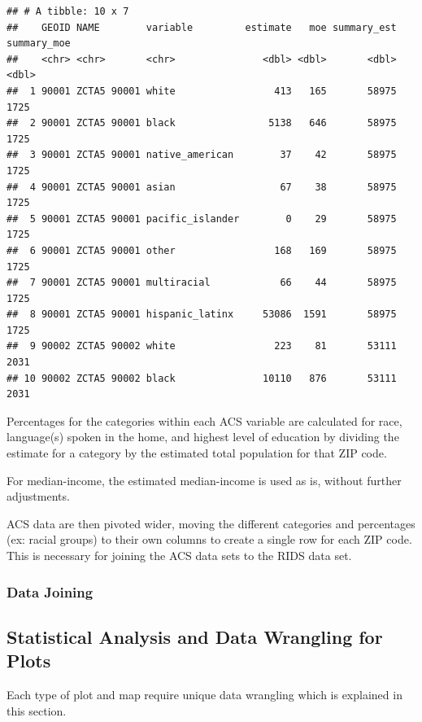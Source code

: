 \documentclass[
]{book}
\begin{document}
\begin{verbatim}
## # A tibble: 10 x 7
##    GEOID NAME        variable         estimate   moe summary_est summary_moe
##    <chr> <chr>       <chr>               <dbl> <dbl>       <dbl>       <dbl>
##  1 90001 ZCTA5 90001 white                 413   165       58975        1725
##  2 90001 ZCTA5 90001 black                5138   646       58975        1725
##  3 90001 ZCTA5 90001 native_american        37    42       58975        1725
##  4 90001 ZCTA5 90001 asian                  67    38       58975        1725
##  5 90001 ZCTA5 90001 pacific_islander        0    29       58975        1725
##  6 90001 ZCTA5 90001 other                 168   169       58975        1725
##  7 90001 ZCTA5 90001 multiracial            66    44       58975        1725
##  8 90001 ZCTA5 90001 hispanic_latinx     53086  1591       58975        1725
##  9 90002 ZCTA5 90002 white                 223    81       53111        2031
## 10 90002 ZCTA5 90002 black               10110   876       53111        2031
\end{verbatim}

Percentages for the categories within each ACS variable are calculated for race, language(s) spoken in the home, and highest level of education by dividing the estimate for a category by the estimated total population for that ZIP code.

For median-income, the estimated median-income is used as is, without further adjustments.

ACS data are then pivoted wider, moving the different categories and percentages (ex: racial groups) to their own columns to create a single row for each ZIP code. This is necessary for joining the ACS data sets to the RIDS data set.

\hypertarget{data-joining}{%
\subsubsection{Data Joining}\label{data-joining}}

\hypertarget{statistical-analysis-and-data-wrangling-for-plots}{%
\subsection{Statistical Analysis and Data Wrangling for Plots}\label{statistical-analysis-and-data-wrangling-for-plots}}

Each type of plot and map require unique data wrangling which is explained in this section.
\end{document}
